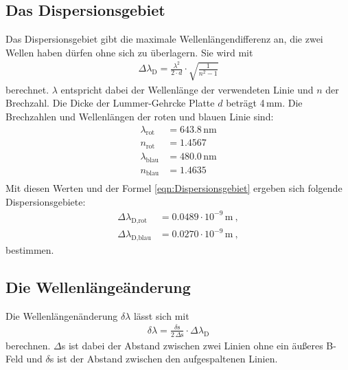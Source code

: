 \subsection{Das Dispersionsgebiet}
Das Dispersionsgebiet gibt die maximale Wellenlängendifferenz an, die zwei Wellen haben dürfen ohne sich zu überlagern. Sie wird mit
\begin{align}
  \Delta\lambda_\text{D} = \frac{\lambda^2}{2\cdot d} \cdot \sqrt{\frac{1}{n^2 - 1}}
  \label{eqn:Dispersionsgebiet}
\end{align}
berechnet. $\lambda$ entspricht dabei der Wellenlänge der verwendeten Linie und $n$ der Brechzahl. Die Dicke der Lummer-Gehrcke Platte $d$ beträgt 4\,mm. Die Brechzahlen und Wellenlängen der roten und blauen Linie sind:
\begin{align*}
  \lambda_\text{rot} &= 643.8\,\text{nm} \\
  n_\text{rot} &= 1.4567 \\
  \lambda_\text{blau} &= 480.0\,\text{nm} \\
  n_\text{blau} &= 1.4635 \\
\end{align*}
Mit diesen Werten und der Formel \eqref{eqn:Dispersionsgebiet} ergeben sich folgende Dispersionsgebiete:
\begin{align*}
  \Delta\lambda_\text{D,rot} &= 0.0489 \cdot 10^{-9}\,\text{m}\ , \\
  \Delta\lambda_\text{D,blau} &= 0.0270 \cdot 10^{-9}\,\text{m}\ ,
\end{align*}
bestimmen.


\subsection{Die Wellenlängeänderung}
Die Wellenlängenänderung $\delta\lambda$ lässt sich mit
\begin{align}
  \delta\lambda = \frac{\delta\text{s}}{2\,\Delta\text{s}}\cdot \Delta\lambda_\text{D}
  \label{eqn:Verschiebung}
\end{align}
berechnen. $\Delta$s ist dabei der Abstand zwischen zwei Linien ohne ein äußeres B-Feld und $\delta$s ist der Abstand zwischen den aufgespaltenen Linien.



